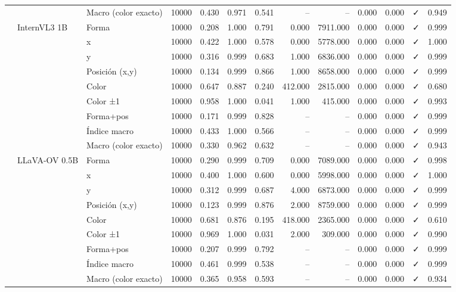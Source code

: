 \begin{tabular}{lllrrrrrrrrlr}
 &  & Macro (color exacto) & 10000 & 0.430 & 0.971 & 0.541 & -- & -- & 0.000 & 0.000 & ✓ & 0.949 \\
\cline{2-13}
 & \multirow[t]{9}{*}{InternVL3 1B} & Forma & 10000 & 0.208 & 1.000 & 0.791 & 0.000 & 7911.000 & 0.000 & 0.000 & ✓ & 0.999 \\
 &  & x & 10000 & 0.422 & 1.000 & 0.578 & 0.000 & 5778.000 & 0.000 & 0.000 & ✓ & 1.000 \\
 &  & y & 10000 & 0.316 & 0.999 & 0.683 & 1.000 & 6836.000 & 0.000 & 0.000 & ✓ & 0.999 \\
 &  & Posición (x,y) & 10000 & 0.134 & 0.999 & 0.866 & 1.000 & 8658.000 & 0.000 & 0.000 & ✓ & 0.999 \\
 &  & Color & 10000 & 0.647 & 0.887 & 0.240 & 412.000 & 2815.000 & 0.000 & 0.000 & ✓ & 0.680 \\
 &  & Color ±1 & 10000 & 0.958 & 1.000 & 0.041 & 1.000 & 415.000 & 0.000 & 0.000 & ✓ & 0.993 \\
 &  & Forma+pos & 10000 & 0.171 & 0.999 & 0.828 & -- & -- & 0.000 & 0.000 & ✓ & 0.999 \\
 &  & Índice macro & 10000 & 0.433 & 1.000 & 0.566 & -- & -- & 0.000 & 0.000 & ✓ & 0.999 \\
 &  & Macro (color exacto) & 10000 & 0.330 & 0.962 & 0.632 & -- & -- & 0.000 & 0.000 & ✓ & 0.943 \\
\cline{2-13}
 & \multirow[t]{9}{*}{LLaVA-OV 0.5B} & Forma & 10000 & 0.290 & 0.999 & 0.709 & 0.000 & 7089.000 & 0.000 & 0.000 & ✓ & 0.998 \\
 &  & x & 10000 & 0.400 & 1.000 & 0.600 & 0.000 & 5998.000 & 0.000 & 0.000 & ✓ & 1.000 \\
 &  & y & 10000 & 0.312 & 0.999 & 0.687 & 4.000 & 6873.000 & 0.000 & 0.000 & ✓ & 0.999 \\
 &  & Posición (x,y) & 10000 & 0.123 & 0.999 & 0.876 & 2.000 & 8759.000 & 0.000 & 0.000 & ✓ & 0.999 \\
 &  & Color & 10000 & 0.681 & 0.876 & 0.195 & 418.000 & 2365.000 & 0.000 & 0.000 & ✓ & 0.610 \\
 &  & Color ±1 & 10000 & 0.969 & 1.000 & 0.031 & 2.000 & 309.000 & 0.000 & 0.000 & ✓ & 0.990 \\
 &  & Forma+pos & 10000 & 0.207 & 0.999 & 0.792 & -- & -- & 0.000 & 0.000 & ✓ & 0.999 \\
 &  & Índice macro & 10000 & 0.461 & 0.999 & 0.538 & -- & -- & 0.000 & 0.000 & ✓ & 0.999 \\
 &  & Macro (color exacto) & 10000 & 0.365 & 0.958 & 0.593 & -- & -- & 0.000 & 0.000 & ✓ & 0.934 \\

\end{tabular}
